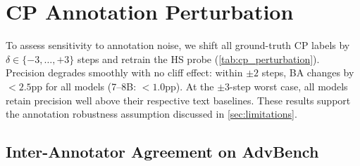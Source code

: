 \section{CP Annotation Perturbation}
\label{app:cp_perturbation}

To assess sensitivity to annotation noise, we shift all ground-truth CP labels by $\delta \in \{-3, \ldots, +3\}$ steps and retrain the HS probe (\cref{tab:cp_perturbation}). Precision degrades smoothly with no cliff effect: within $\pm 2$ steps, BA changes by ${<}2.5$pp for all models (7--8B: ${<}1.0$pp). At the $\pm 3$-step worst case, all models retain precision well above their respective text baselines. These results support the annotation robustness assumption discussed in \cref{sec:limitations}.

\begin{table}[h!]
\centering
\small
\caption{HS probe sensitivity to CP annotation shift ($\delta$ steps). BA is stable across all perturbations; precision degrades gradually without cliff effects.}
\label{tab:cp_perturbation}
\end{table}

\subsection{Inter-Annotator Agreement on AdvBench}
\label{app:iaa}

